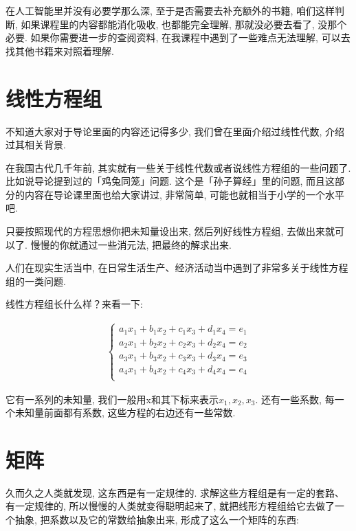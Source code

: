 在人工智能里并没有必要学那么深, 至于是否需要去补充额外的书籍, 咱们这样判断, 如果课程里的内容都能消化吸收, 也都能完全理解, 那就没必要去看了, 没那个必要. 如果你需要进一步的查阅资料, 在我课程中遇到了一些难点无法理解, 可以去找其他书籍来对照着理解. 

\section{线性方程组}

不知道大家对于导论里面的内容还记得多少, 我们曾在里面介绍过线性代数, 介绍过其相关背景. 

在我国古代几千年前, 其实就有一些关于线性代数或者说线性方程组的一些问题了. 比如说导论提到过的「鸡兔同笼」问题. 这个是「孙子算经」里的问题, 而且这部分的内容在导论课里面也给大家讲过, 非常简单, 可能也就相当于小学的一个水平吧. 

只要按照现代的方程思想你把未知量设出来, 然后列好线性方程组, 去做出来就可以了. 慢慢的你就通过一些消元法, 把最终的解求出来. 

人们在现实生活当中, 在日常生活生产、经济活动当中遇到了非常多关于线性方程组的一类问题. 

线性方程组长什么样？来看一下: 

\begin{align*}
  \begin{cases}
    a_1x_1 + b_1x_2+ c_1x_3 + d_1x_4 = e_1 \\
    a_2x_1 + b_2x_2+ c_2x_3 + d_2x_4 = e_2 \\
    a_3x_1 + b_3x_2+ c_3x_3 + d_3x_4 = e_3 \\
    a_4x_1 + b_4x_2+ c_4x_3 + d_4x_4 = e_4 \\
  \end{cases}
\end{align*}


它有一系列的未知量, 我们一般用x和其下标来表示$x_1, x_2, x_3$.  还有一些系数, 每一个未知量前面都有系数, 这些方程的右边还有一些常数. 

\section{矩阵}

久而久之人类就发现, 这东西是有一定规律的. 求解这些方程组是有一定的套路、有一定规律的, 所以慢慢的人类就变得聪明起来了, 就把线形方程组给它去做了一个抽象, 把系数以及它的常数给抽象出来, 形成了这么一个矩阵的东西:

